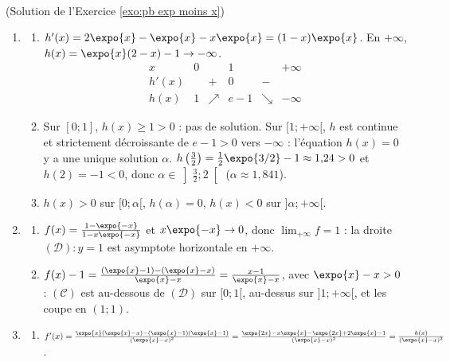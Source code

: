 \begin{corrige}
\begin{sol} ~ \\
(Solution de l'Exercice \ref{exo:pb exp moins x})
\begin{enumerate}
\item \begin{enumerate}
      \item $h'(x) = 2\expo{x} - \expo{x} - x\expo{x} = (1 - x)\expo{x}$. En $+\infty$, $h(x) = \expo{x}(2 - x) - 1 \to -\infty$.
            \[
            \begin{array}{c|ccccc}
            x & 0 & & 1 & & +\infty \\ \hline
            h'(x) & & + & 0 & - & \\ \hline
            h(x) & 1 & \nearrow & e - 1 & \searrow & -\infty
            \end{array}
            \]
      \item Sur $[0 ; 1]$, $h(x) \geq 1 > 0$ : pas de solution. Sur $[1 ; +\infty[$, $h$ est continue et strictement d\'ecroissante
            de $e - 1 > 0$ vers $-\infty$ : l'\'equation $h(x) = 0$ y a une unique solution $\alpha$.
            $h\left(\frac{3}{2}\right) = \frac{1}{2}\expo{3/2} - 1 \approx 1{,}24 > 0$ et $h(2) = -1 < 0$, donc $\alpha \in \left]\frac{3}{2} ; 2\right[$
            ($\alpha \approx 1{,}841$).
      \item $h(x) > 0$ sur $[0 ; \alpha[$, $h(\alpha) = 0$, $h(x) < 0$ sur $]\alpha ; +\infty[$.
      \end{enumerate}
\item \begin{enumerate}
      \item $f(x) = \frac{1 - \expo{-x}}{1 - x\expo{-x}}$ et $x\expo{-x} \to 0$, donc $\lim_{+\infty} f = 1$ :
            la droite $(\mathcal{D}) : y = 1$ est asymptote horizontale en $+\infty$.
      \item $f(x) - 1 = \frac{(\expo{x} - 1) - (\expo{x} - x)}{\expo{x} - x} = \frac{x - 1}{\expo{x} - x}$, avec $\expo{x} - x > 0$ :
            $(\mathscr{C})$ est au-dessous de $(\mathcal{D})$ sur $[0 ; 1[$, au-dessus sur $]1 ; +\infty[$, et les coupe en $(1 ; 1)$.
      \end{enumerate}
\item \begin{enumerate}
      \item $f'(x) = \frac{\expo{x}(\expo{x} - x) - (\expo{x} - 1)(\expo{x} - 1)}{(\expo{x} - x)^2}
            = \frac{\expo{2x} - x\expo{x} - \expo{2x} + 2\expo{x} - 1}{(\expo{x} - x)^2} = \frac{h(x)}{(\expo{x} - x)^2}$.

\end{enumerate}
\end{enumerate}
\end{sol}
\end{corrige}
